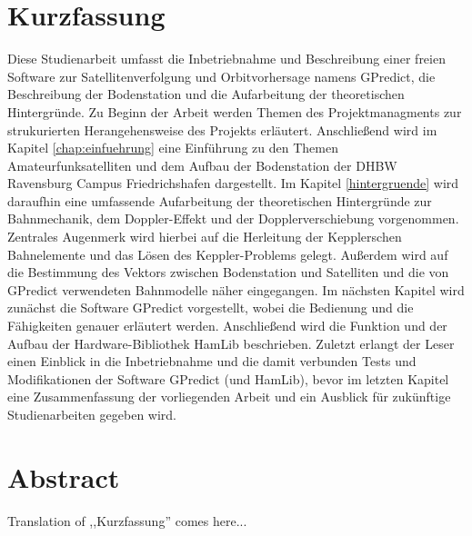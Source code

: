 
\chapter*{Kurzfassung}
Diese Studienarbeit umfasst die Inbetriebnahme und Beschreibung einer freien Software zur Satellitenverfolgung und Orbitvorhersage namens GPredict, die Beschreibung der Bodenstation und die Aufarbeitung der theoretischen Hintergründe.\newpar
Zu Beginn der Arbeit werden Themen des Projektmanagments zur strukurierten Herangehensweise des Projekts erläutert. Anschließend wird im Kapitel \ref{chap:einfuehrung} eine Einführung zu den Themen Amateurfunksatelliten und dem Aufbau der Bodenstation der \ac{DHBW} Ravensburg Campus Friedrichshafen dargestellt.\newpar
Im Kapitel \ref{hintergruende} wird daraufhin eine umfassende Aufarbeitung der theoretischen Hintergründe zur Bahnmechanik, dem Doppler-Effekt und der Dopplerverschiebung vorgenommen. Zentrales Augenmerk wird hierbei auf die Herleitung der Kepplerschen Bahnelemente und das Lösen des Keppler-Problems gelegt. Außerdem wird auf die Bestimmung des Vektors zwischen Bodenstation und Satelliten und die von GPredict verwendeten Bahnmodelle näher eingegangen.\newpar
Im nächsten Kapitel wird zunächst die Software GPredict vorgestellt, wobei die Bedienung und die Fähigkeiten genauer erläutert werden. Anschließend wird die Funktion und der Aufbau der Hardware-Bibliothek HamLib beschrieben. Zuletzt erlangt der Leser einen Einblick in die Inbetriebnahme und die damit verbunden Tests und Modifikationen der Software GPredict (und HamLib), bevor im letzten Kapitel eine Zusammenfassung der vorliegenden Arbeit und ein Ausblick für zukünftige Studienarbeiten gegeben wird.

\chapter*{Abstract}

\iffalse
\vspace{3em}
\begin{Huge}
	\textbf{Abstract}
\end{Huge}
\vspace{1.5em}
\fi

Translation of ,,Kurzfassung'' comes here...